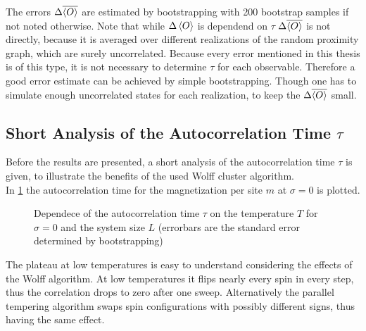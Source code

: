 The errors \(\Delta \overline{\left< O \right>}\) are estimated by bootstrapping
\cite{Bootstrap} with 200 bootstrap samples if not noted otherwise.
Note that while \(\Delta \left< O \right>\) is dependend on \(\tau\) \cite[p. 151]{Katzgraber2011}
\(\Delta \overline{\left< O \right>}\) is not directly, because it is averaged
over different realizations of the random proximity graph, which are
surely uncorrelated.
Because every error mentioned in this thesis is of this type, it is not
necessary to determine \(\tau\) for each observable. Therefore a good
error estimate can be achieved by simple bootstrapping. Though one has
to simulate enough uncorrelated states for each realization, to keep
the \(\Delta \overline{\left< O \right>}\) small.

\subsection{Short Analysis of the Autocorrelation Time  $\tau$}
    Before the results are presented, a short analysis of the
    autocorrelation time \(\tau\) is given, to illustrate the benefits
    of the used Wolff cluster algorithm.\\
    In \ref{fig:autocorr}
    the autocorrelation time for the magnetization per site \(m\) at \(\sigma=0\) is plotted.
    \begin{figure}[htbp]
        \centering
        \caption[The Autocorrelation Time $\tau$]
        {
            Dependece of the autocorrelation time $\tau$ on
             the temperature $T$ for
                $\sigma=0$ and
             the system size $L$ (errorbars
                are the standard error determined by bootstrapping)
        }
        \label{fig:autocorr}
    \end{figure}
    The plateau at low temperatures is easy to understand considering the
    effects of the Wolff algorithm. At low temperatures it flips nearly every
    spin in every step, thus the correlation drops to zero after one sweep.
    Alternatively the parallel tempering algorithm swaps spin configurations
    with possibly different signs, thus having the same effect.
